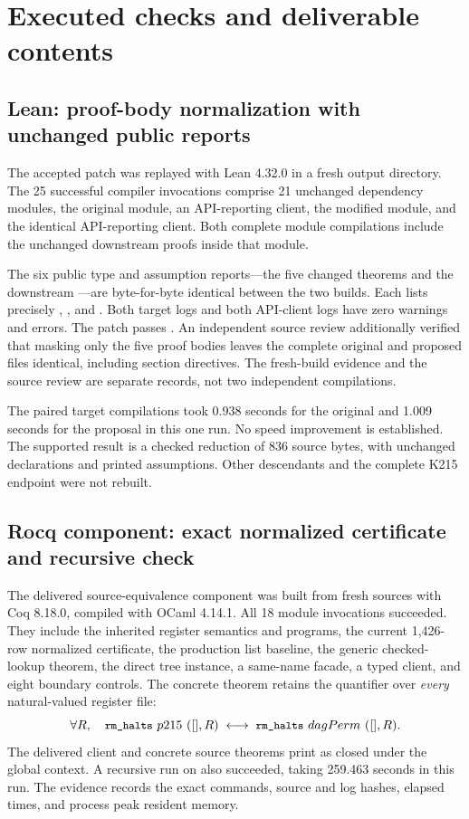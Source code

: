\section{Executed checks and deliverable contents}\label{sec:results}

\subsection{Lean: proof-body normalization with unchanged public reports}
The accepted patch was replayed with Lean 4.32.0 in a fresh output directory. The 25 successful compiler invocations comprise 21 unchanged dependency modules, the original  module, an API-reporting client, the modified module, and the identical API-reporting client. Both complete module compilations include the unchanged downstream proofs inside that module.

The six public type and assumption reports---the five changed theorems and the downstream ---are byte-for-byte identical between the two builds. Each lists precisely , , and . Both target logs and both API-client logs have zero warnings and errors. The patch passes . An independent source review additionally verified that masking only the five proof bodies leaves the complete original and proposed files identical, including section directives. The fresh-build evidence and the source review are separate records, not two independent compilations.

The paired target compilations took 0.938 seconds for the original and 1.009 seconds for the proposal in this one run. No speed improvement is established. The supported result is a checked reduction of 836 source bytes, with unchanged declarations and printed assumptions. Other descendants and the complete K215 endpoint were not rebuilt.

\subsection{Rocq component: exact normalized certificate and recursive check}
The delivered source-equivalence component was built from fresh sources with Coq 8.18.0, compiled with OCaml 4.14.1. All 18 module invocations succeeded. They include the inherited register semantics and programs, the current 1,426-row normalized certificate, the production list baseline, the generic checked-lookup theorem, the direct tree instance, a same-name  facade, a typed client, and eight boundary controls. The concrete theorem retains the quantifier over \emph{every} natural-valued register file:
\[
 \forall R,\quad
 \texttt{\small rm\_halts}\ p215\ ([],R)
 \;\longleftrightarrow\;
 \texttt{\small rm\_halts}\ dagPerm\ ([],R).
\]
The delivered client and concrete source theorems print as closed under the global context. A recursive  run on  also succeeded, taking 259.463 seconds in this run. The evidence records the exact commands, source and log hashes, elapsed times, and process peak resident memory.

